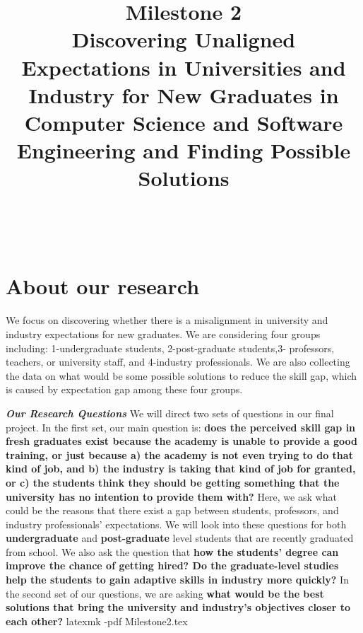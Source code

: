 \documentclass{sigchi}
\begin{document}
\title{Milestone 2\\ Discovering Unaligned Expectations in Universities and Industry for New Graduates in Computer Science and Software Engineering and Finding Possible Solutions}

\author{%
  \\
  \\
}

\maketitle

\section{About our research}
We focus on discovering whether there is a misalignment in university and industry expectations for new graduates. We are considering four groups including: 1-undergraduate students, 2-post-graduate students,3- professors, teachers, or university staff, and 4-industry professionals. We are also collecting the data on what would be some possible solutions to reduce the skill gap, which is caused by expectation gap among these four groups.

\textit{\textbf{Our Research Questions}}\newline
We will direct two sets of questions in our final project. In the first set, our main question is: \textbf{does the perceived skill gap in fresh graduates exist because the academy is unable to provide a good training, or just because a) the academy is not even trying to do that kind of job, and b) the industry is taking that kind of job for granted, or c) the students think they should be getting something that the university has no intention to provide them with?} Here, we ask what could be the reasons that there exist a gap between students, professors, and industry professionals' expectations. We will look into these questions for both \textbf{undergraduate} and \textbf{post-graduate} level students that are recently graduated from school. We also ask the question that \textbf{how the students' degree can improve the chance of getting hired? Do the graduate-level studies help the students to gain adaptive skills in industry more quickly?}\newline
In the second set of our questions, we are asking \textbf{what would be the best solutions that bring the university and industry's objectives closer to each other?} 
latexmk -pdf Milestone2.tex
\end{document}

